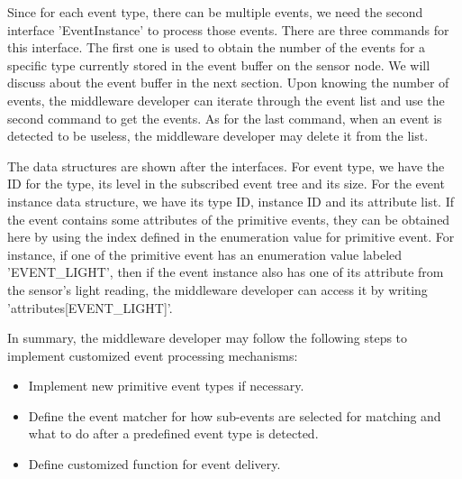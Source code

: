 Since for each event type, there can be multiple events, we need the second interface 'EventInstance' to process those events. There are three commands for this interface. The first one is used to obtain the number of the events for a specific type currently stored in the event buffer on the sensor node. We will discuss about the event buffer in the next section. Upon knowing the number of events, the middleware developer can iterate through the event list and use the second command to get the events. As for the last command, when an event is detected to be useless, the middleware developer may delete it from the list.

The data structures are shown after the interfaces. For event type, we have the ID for the type, its level in the subscribed event tree and its size. For the event instance data structure, we have its type ID, instance ID and its attribute list. If the event contains some attributes of the primitive events, they can be obtained here by using the index defined in the enumeration value for primitive event. For instance, if one of the primitive event has an enumeration value labeled 'EVENT\_LIGHT', then if the event instance also has one of its attribute from the sensor's light reading, the middleware developer can access it by writing 'attributes[EVENT\_LIGHT]'.

In summary, the middleware developer may follow the following steps to implement customized event processing mechanisms:
\begin{itemize} 
\item Implement new primitive event types if necessary.
\item Define the event matcher for how sub-events are selected for matching and what to do after a predefined event type is detected.
\item Define customized function for event delivery.
\end{itemize}